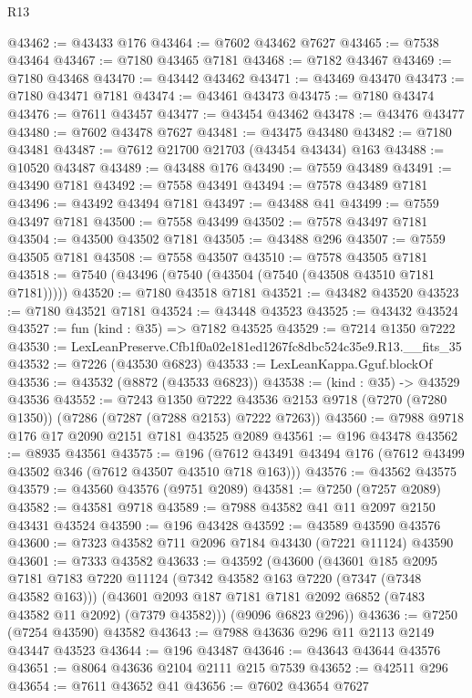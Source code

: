 \begin{lexlean}{R13}
\begin{coremodule}
@43462 := @43433 @176
@43464 := @7602 @43462 @7627
@43465 := @7538 @43464
@43467 := @7180 @43465 @7181
@43468 := @7182 @43467
@43469 := @7180 @43468
@43470 := @43442 @43462
@43471 := @43469 @43470
@43473 := @7180 @43471 @7181
@43474 := @43461 @43473
@43475 := @7180 @43474
@43476 := @7611 @43457
@43477 := @43454 @43462
@43478 := @43476 @43477
@43480 := @7602 @43478 @7627
@43481 := @43475 @43480
@43482 := @7180 @43481
@43487 := @7612 @21700 @21703 (@43454 @43434) @163
@43488 := @10520 @43487
@43489 := @43488 @176
@43490 := @7559 @43489
@43491 := @43490 @7181
@43492 := @7558 @43491
@43494 := @7578 @43489 @7181
@43496 := @43492 @43494 @7181
@43497 := @43488 @41
@43499 := @7559 @43497 @7181
@43500 := @7558 @43499
@43502 := @7578 @43497 @7181
@43504 := @43500 @43502 @7181
@43505 := @43488 @296
@43507 := @7559 @43505 @7181
@43508 := @7558 @43507
@43510 := @7578 @43505 @7181
@43518 := @7540 (@43496 (@7540 (@43504 (@7540 (@43508 @43510 @7181 @7181)))))
@43520 := @7180 @43518 @7181
@43521 := @43482 @43520
@43523 := @7180 @43521 @7181
@43524 := @43448 @43523
@43525 := @43432 @43524
@43527 := fun (kind : @35) => @7182 @43525
@43529 := @7214 @1350 @7222
@43530 := LexLeanPreserve.Cfb1f0a02e181ed1267fc8dbc524c35e9.R13.__fits_35
@43532 := @7226 (@43530 @6823)
@43533 := LexLeanKappa.Gguf.blockOf
@43536 := @43532 (@8872 (@43533 @6823))
@43538 := (kind : @35) -> @43529 @43536
@43552 := @7243
    @1350
    @7222
    @43536
    @2153
    @9718
    (@7270 (@7280 @1350))
    (@7286 (@7287 (@7288 @2153) @7222 @7263))
@43560 := @7988 @9718 @176 @17 @2090 @2151 @7181 @43525 @2089
@43561 := @196 @43478
@43562 := @8935 @43561
@43575 := @196 (@7612 @43491 @43494 @176 (@7612 @43499 @43502 @346 (@7612 @43507 @43510 @718 @163)))
@43576 := @43562 @43575
@43579 := @43560 @43576 (@9751 @2089)
@43581 := @7250 (@7257 @2089)
@43582 := @43581 @9718
@43589 := @7988 @43582 @41 @11 @2097 @2150 @43431 @43524
@43590 := @196 @43428
@43592 := @43589 @43590 @43576
@43600 := @7323 @43582 @711 @2096 @7184 @43430 (@7221 @11124) @43590
@43601 := @7333 @43582
@43633 := @43592
    (@43600
      (@43601
        @185
        @2095
        @7181
        @7183
        @7220
        @11124
        (@7342 @43582 @163 @7220 (@7347 (@7348 @43582 @163)))
        (@43601 @2093 @187 @7181 @7181 @2092 @6852 (@7483 @43582 @11 @2092) (@7379 @43582)))
      (@9096 @6823 @296))
@43636 := @7250 (@7254 @43590) @43582
@43643 := @7988 @43636 @296 @11 @2113 @2149 @43447 @43523
@43644 := @196 @43487
@43646 := @43643 @43644 @43576
@43651 := @8064 @43636 @2104 @2111 @215 @7539
@43652 := @42511 @296
@43654 := @7611 @43652 @41
@43656 := @7602 @43654 @7627

\end{coremodule}
\end{lexlean}

